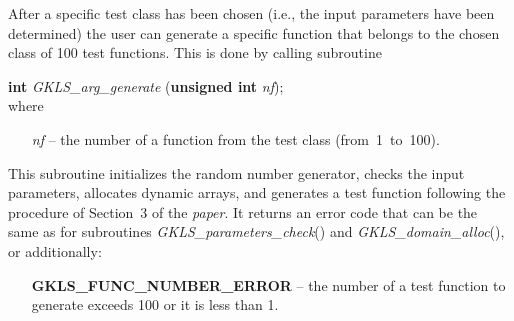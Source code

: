 \documentclass[acmtoms]{acmtrans2m}
\begin{document}
After a specific test class has been chosen (i.e., the input
parameters have been determined) the user can generate a specific
function that belongs to the chosen class of 100 test functions.
This is done by calling subroutine

{\bf int} {\it GKLS\_arg\_generate} ({\bf unsigned int} {\it nf}); \\
where
\begin{itemize}
 \item[\it nf] -- the number
 of a function from the test class (from~1~to~100).
\end{itemize}
This subroutine initializes the random number generator, checks
the input parameters, allocates dynamic arrays, and generates a
test function following the procedure of Section~3 of the {\it
paper}. It returns an error code that can be the same as for
subroutines {\it GKLS\_parameters\_check}() and {\it
GKLS\_domain\_alloc}(), or additionally:
\begin{itemize}
 \item[\bf GKLS\_FUNC\_NUMBER\_ERROR] -- the number of a test function to
 generate exceeds 100 or it is less than 1.
\end{itemize}
\end{document}
